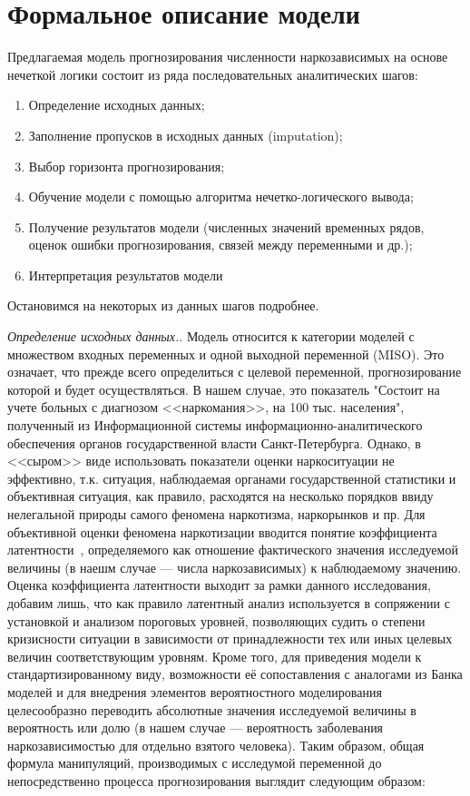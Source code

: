 \section{Формальное описание модели}
Предлагаемая модель прогнозирования численности наркозависимых на основе
нечеткой логики состоит из ряда последовательных аналитических шагов:
\begin{enumerate}
    \item Определение исходных данных;
    \item Заполнение пропусков в исходных данных (imputation);
    \item Выбор горизонта прогнозирования;
    \item Обучение модели с помощью алгоритма нечетко-логического вывода;
    \item Получение результатов модели (численных значений временных рядов,
        оценок ошибки прогнозирования, связей между переменными и др.);
    \item Интерпретация результатов модели 
\end{enumerate}
Остановимся на некоторых из данных шагов подробнее. 

\textit{Определение исходных данных.}. Модель относится к категории моделей с
множеством входных переменных и одной выходной переменной (MISO). Это означает,
что прежде всего определиться с целевой переменной, прогнозирование которой и
будет осуществляться. В нашем случае, это показатель "Состоит на учете больных с
диагнозом <<наркомания>>, на 100 тыс. населения", полученный из Информационной
системы информационно-аналитического обеспечения органов государственной власти
Санкт-Петербурга. Однако, в <<сыром>> виде использовать показатели оценки
наркоситуации не эффективно, т.к. ситуация, наблюдаемая органами государственной
статистики и объективная ситуация, как правило, расходятся на несколько порядков
ввиду нелегальной природы самого феномена наркотизма, наркорынков и пр. Для
объективной оценки феномена наркотизации вводится понятие коэффициента
латентности~\cite{Zakharov2012}, определяемого как отношение фактического значения исследуемой
величины (в наешм случае --- числа наркозависимых) к наблюдаемому значению.
Оценка коэффициента латентности выходит за рамки данного исследования, добавим
лишь, что как правило латентный анализ используется  в сопряжении с установкой и
анализом пороговых уровней, позволяющих судить о степени кризисности ситуации в
зависимости от принадлежности тех или иных целевых величин соответствующим
уровням. Кроме того, для приведения модели к стандартизированному виду,
возможности её сопоставления с аналогами из Банка моделей и для внедрения
элементов вероятностного моделирования целесообразно переводить абсолютные
значения исследуемой величины в вероятность или долю (в нашем случае ---
вероятность заболевания наркозависимостью для отдельно взятого человека). Таким
образом, общая формула манипуляций, производимых с исследумой переменной до
непосредственно процесса прогнозирования выглядит следующим образом:

